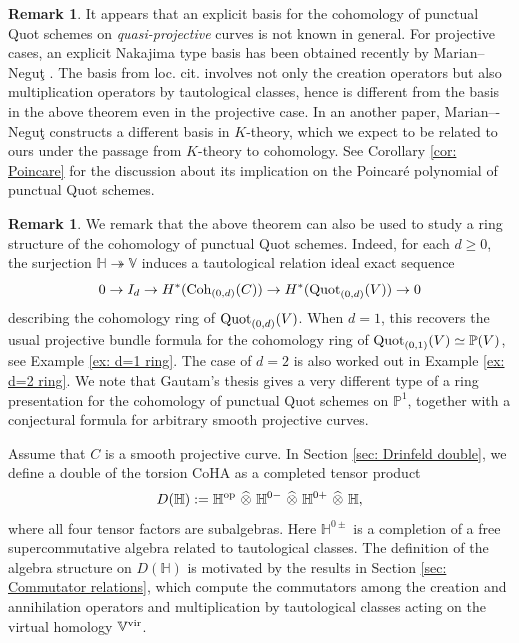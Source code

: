 \documentclass[10pt]{amsart}
\newcommand{\BP}{\mathbb{P}}
\newcommand{\BH}{\mathbb{H}}
\newcommand{\BV}{\mathbb{V}}
\newcommand{\Quot}{\textnormal{Quot}}
\newcommand{\Coh}{\textnormal{Coh}}
\newcommand{\+}{{}^+}
\newcommand{\vir}{\textnormal{vir}}
\theoremstyle{definition}
\theoremstyle {definition}
\newtheorem{remark}[theorem]{Remark}
\theoremstyle {definition}
\begin{document}
\begin{remark}
    It appears that an explicit basis for the cohomology of punctual Quot schemes on {\it quasi-projective} curves is not known in general. For projective cases, an explicit Nakajima type basis has been obtained recently by Marian--Negu\c t \cite{marian2026cohomologyquotschemesmooth}. The basis from loc. cit. involves not only the creation operators but also multiplication operators by tautological classes, hence is different from the basis in the above theorem even in the projective case. In an another paper, Marian–-Negu\c t \cite[Thm. 2]{negutmarianderived} constructs a different basis in $K$-theory, which we expect to be related to ours under the passage from $K$-theory to cohomology. See Corollary \ref{cor: Poincare} for the discussion about its implication on the Poincar\'e polynomial of punctual Quot schemes. 
\end{remark}

\begin{remark}
    We remark that the above theorem can also be used to study a ring structure of the cohomology of punctual Quot schemes. Indeed, for each $d\geq 0$, the surjection $\BH\twoheadrightarrow\BV$ induces a tautological relation ideal exact sequence
    $$0\rightarrow I_d\rightarrow H^*(\Coh_{(0,d)}(C))\rightarrow H^*(\Quot_{(0,d)}(V))\rightarrow 0
    $$
    describing the cohomology ring of $\Quot_{(0,d)}(V)$. When $d=1$, this recovers the usual projective bundle formula for the cohomology ring of $\Quot_{(0,1)}(V)\simeq \BP(V)$, see Example \ref{ex: d=1 ring}. The case of $d=2$ is also worked out in Example \ref{ex: d=2 ring}. We note that Gautam's thesis \cite[Thm. 3.0.2]{Gautam} gives a very different type of a ring presentation for the cohomology of punctual Quot schemes on $\BP^1$, together with a conjectural formula for arbitrary smooth projective curves.
\end{remark}




Assume that $C$ is a smooth projective curve. In Section \ref{sec: Drinfeld double}, we define a double of the torsion CoHA as a completed tensor product
$$D(\BH):=\BH^{\textnormal{op}}\ \widehat \otimes\ \BH^{0-}\ \widehat \otimes\ \BH^{0+}\ \widehat \otimes\ \BH,
$$
where all four tensor factors are subalgebras. Here $\BH^{0\pm}$ is a  completion of a free supercommutative algebra related to tautological classes. The definition of the algebra structure on $D(\BH)$ is motivated by the results in Section \ref{sec: Commutator relations}, which compute the commutators among the creation and annihilation operators and multiplication by tautological classes acting on the virtual homology $\BV^\vir$.
\end{document}
